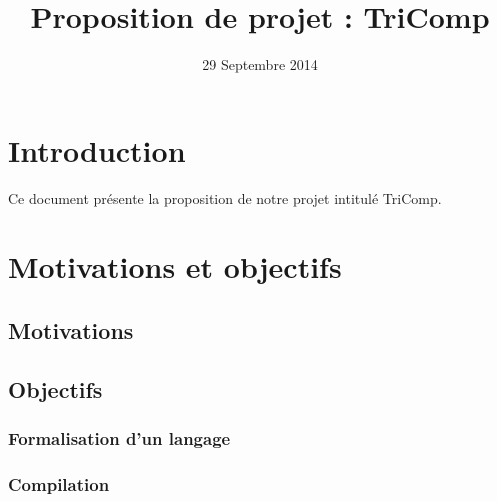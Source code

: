 \documentclass{article}
\title{Proposition de projet : TriComp}
\author{}
\date{29 Septembre 2014}
\begin{document}
\maketitle
\pagebreak

%


\section{Introduction}

Ce document présente la proposition de notre projet intitulé TriComp.

\section{Motivations et objectifs}

\subsection{Motivations}

\subsection{Objectifs}

\subsubsection{Formalisation d'un langage}

\subsubsection{Compilation}
\end{document}
